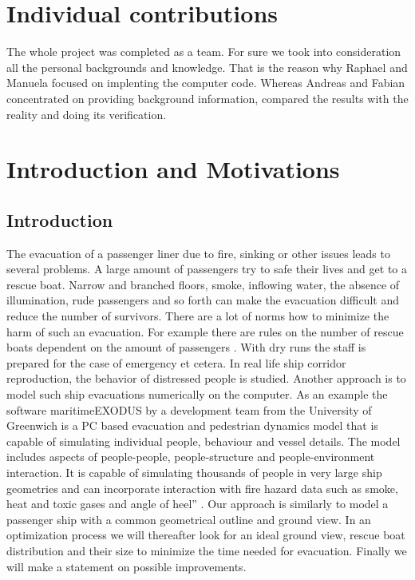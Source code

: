 \documentclass[11pt]{article}
\begin{document}
\section{Individual contributions}
The whole project was completed as a team. For sure we took into consideration all the personal backgrounds and  knowledge. That is the reason why Raphael and Manuela focused on implenting the computer code. Whereas Andreas and Fabian concentrated on providing background information, compared the results with the reality and doing its verification.





\newpage
\section{Introduction and Motivations}
\subsection{Introduction}
The evacuation of a passenger liner due to fire, sinking or other issues leads to several problems. A large amount of passengers try to safe their lives and get to a rescue boat. Narrow and branched floors, smoke, inflowing water, the absence of illumination, rude passengers and so forth can make the evacuation difficult and reduce the number of survivors.
There are a lot of norms how to minimize the harm of such an evacuation. For example there are rules on the number of rescue boats dependent on the amount of passengers \cite{SOLAS}. With dry runs the staff is prepared for the case of emergency et cetera. In real life ship corridor reproduction, the behavior of distressed people is studied.
Another approach is to model such ship evacuations numerically on the computer. As an example the software maritimeEXODUS by a development team from the University of Greenwich is a PC based evacuation and pedestrian dynamics model that is capable of simulating individual people, behaviour and vessel details. The model includes aspects of people-people, people-structure and people-environment interaction. It is capable of simulating thousands of people in very large ship geometries and can incorporate interaction with fire hazard data such as smoke, heat and toxic gases and angle of heel” \cite{EXODUS}.
Our approach is similarly to model a passenger ship with a common geometrical outline and ground view. In an optimization process we will thereafter look for an ideal ground view, rescue boat distribution and their size to minimize the time needed for evacuation. Finally we will make a statement on possible improvements.
\end{document}
